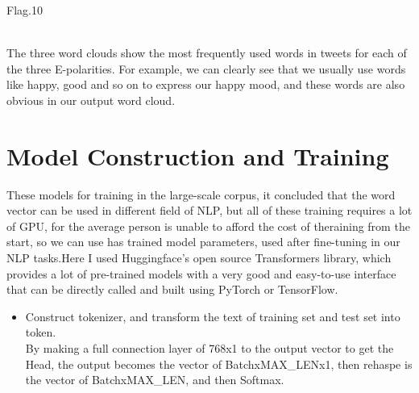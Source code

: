 \begin{center}
\begin{minipage}{0.5\linewidth}
      {\small{Flag.10}}
      \end{minipage}
  \hfill
  ~\\
  The three word clouds show the most frequently used words in tweets
   for each of the three E-polarities.
For example, we can clearly see that we usually use words like happy, 
good and so on to express our happy mood, and these words are also 
obvious in our output word cloud.
\end{center}
\section{Model Construction and Training} 


These models for training in the large-scale corpus, it concluded that the word 
vector can be used in different field of NLP, but all of these training requires
 a lot of GPU, for the average person is unable to afford the cost of theraining
  from the start, so we can use has trained model parameters, used after 
  fine-tuning in our NLP tasks.Here I used Huggingface's open source Transformers 
  library, which provides a lot of pre-trained models with a very good and 
  easy-to-use interface that can be directly called and built using PyTorch or
   TensorFlow.

\begin{itemize}
  \item Construct tokenizer, and transform the text of training set and test set into token.
  ~\\By making a full connection layer of 768x1 to the output vector to get the Head,
   the output becomes the vector of BatchxMAX_LENx1, then rehaspe is the vector of
    BatchxMAX_LEN, and then Softmax.
\end{itemize}

